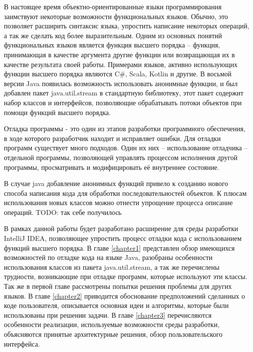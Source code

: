 В настоящее время объектно-ориентированные языки программирования заимствуют некоторые возможности функциональных языков.  Обычно, это позволяет расширить синтаксис языка, упростить написание некоторых операций, а так же сделать код более выразительным. Одним из основных понятий функциональных языков является функция высшего порядка -- функция, принимающая в качестве аргумента другие функции или возвращающая их в качестве результата своей работы. Примерами языков, активно использующих функции высшего порядка являются C\#, Scala, Kotlin и другие. В восьмой версии Java появилась возможность использовать анонимные функции, и был добавлен пакет java.util.stream в стандартную библиотеку, этот пакет содержит набор классов и интерфейсов, позволяющие обрабатывать потоки объектов при помощи функций высшего порядка.

Отладка программы - это один из этапов разработки программного обеспечения, в ходе которого разработчик находит и исправляет ошибки. Для отладки программ существует много подходов. Один их них -- использование отладчика -- отдельной программы, позволяющей управлять процессом исполнения другой программы, просматривать и модифицировать её внутреннее состояние.

В случае java добавление анонимных функций привело к созданию нового способа написания кода для обработки последовательностей объектов. К плюсам использования новых классов можно отнести упрощение процесса описание операций. TODO: так себе получилось

В рамках данной работы будет разработано расширение для среды разработки IntelliJ IDEA, позволяющее упростить процесс отладки кода с использованием функций высшего порядка. В главе \ref{chapter1} представлен обзор имеющихся возможностей по отладке кода на языке Java, разобраны особенности использования классов из пакета java.util.stream, а так же перечислены трудности, возникающие при отладке программ, которые используют эти классы. Так же в первой главе рассмотрены попытки решения проблемы для других языков. В главе \ref{chapter2} приводится обоснование предположений сделанных о коде пользователя, описывается основная идеи и алгоритмы, которые были использованы при решении задачи. В главе \ref{chapter3} перечисляются особенности реализации, используемые возможности среды разработки, объясняются принятые архитектурные решения, обзор пользовательского интерфейса.

